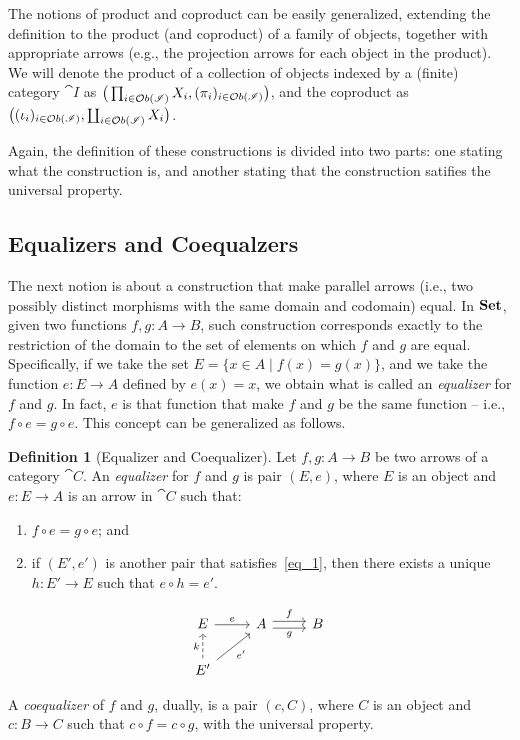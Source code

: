 \documentclass[a4paper, twoside,openright]{report}
\theoremstyle{plain}
\theoremstyle{definition}
\newtheorem{definition}[theorem]{Definition}
\begin{document}
The notions of product and coproduct can be easily generalized, extending the definition to the product (and coproduct) of a family of objects, together with appropriate arrows (e.g., the projection arrows for 
each object in the product). We will denote the product of a collection of objects indexed by a (finite) category $\cat I$ as $\big(\prod_{i \in \mathcal{O}b(\mathscr{I})} X_i, (\pi_i)_{i \in \mathcal{O}b(\mathscr{I})}\big)$, and the coproduct as 
$\big((\iota_i)_{i \in \mathcal{O}b(\mathscr{I})}, \coprod_{i \in \mathcal{O}b(\mathscr{I})} X_i\big)$.

Again, the definition of these constructions is divided into two parts: one stating what the construction is, and another stating that the construction satifies the universal property.

\subsection{Equalizers and Coequalzers}

The next notion is about a construction that make parallel arrows (i.e., two possibly distinct morphisms with the same domain and codomain) equal. In $\mathbf{Set}$, given two functions $f, g: A \rightarrow B$, such construction corresponds exactly to the restriction of the domain to the set of elements on which $f$ and $g$ are equal. Specifically, if we take the set $E = \{x \in A \mid f(x) = g(x)\}$, and we take the function $e: E \rightarrow A$ defined by $e(x) = x$, we obtain what is called an \emph{equalizer} for $f$ and $g$. In fact, $e$ is that function that make $f$ and $g$ be the same function -- i.e., $f \circ e = g \circ e$.
This concept can be generalized as follows.

\begin{definition}[Equalizer and Coequalizer]
    Let $f, g: A \rightarrow B$ be two arrows of a category $\cat C$. An \emph{equalizer} for $f$ and $g$ is pair $(E, e)$, where $E$ is an object and $e: E \rightarrow A$ is an arrow in $\cat C$ such that:
    \begin{enumerate}
        \item \label{eq_1} $ f \circ e = g \circ e$; and
        \item if $(E', e')$ is another pair that satisfies~\ref{eq_1}, then there exists a unique $h: E' \rightarrow E$ such that $e \circ h = e'$.
    \end{enumerate}
    \[
        \begin{tikzcd}
            E \arrow[r, "e"] & A \arrow[r, shift left, "f"] \arrow[r, shift right, "g" swap] & B \\
            E' \arrow[u, dashed, "k"] \arrow[ur, "e'" swap] & 
        \end{tikzcd}
    \]

    A \emph{coequalizer} of $f$ and $g$, dually, is a pair $(c, C)$, where $C$ is an object and $c: B \rightarrow C$ such that $c \circ f = c \circ g$, with the universal property.
\end{definition}
\end{document}
